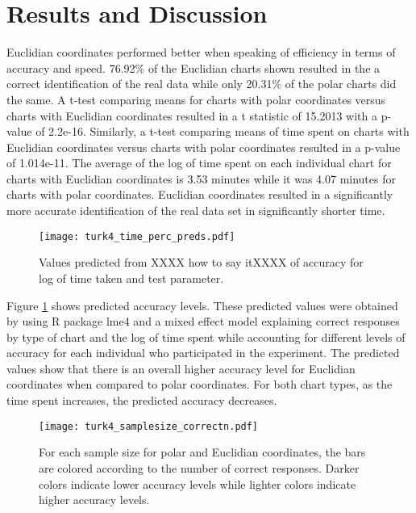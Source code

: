\section{Results and Discussion}

Euclidian coordinates performed better when speaking of efficiency in terms of accuracy and speed. 76.92\% of the Euclidian charts shown resulted in the a correct identification of the real data while only 20.31\% of the polar charts did the same. A t-test comparing means for charts with polar coordinates versus charts with Euclidian coordinates resulted in a t statistic of 15.2013 with a p-value of 2.2e-16. Similarly, a t-test comparing means of time spent on charts with Euclidian coordinates versus charts with polar coordinates resulted in a p-value of 1.014e-11. The average of the log of time spent on each individual chart for charts with Euclidian coordinates is 3.53 minutes while it was 4.07 minutes for charts with polar coordinates. Euclidian coordinates resulted in a significantly more accurate identification of the real data set in significantly shorter time. 

\begin{figure}[htbp] %
   \centering
   \texttt{[image: turk4\_time\_perc\_preds.pdf]}  
   \caption{Values predicted from XXXX how to say itXXXX of accuracy for log of time taken and test parameter.}
   \label{accuracy_preds}
\end{figure}

Figure \ref{accuracy_preds} shows predicted accuracy levels. These predicted values were obtained by using R package lme4 and a mixed effect model explaining correct responses by type of chart and the log of time spent while accounting for different levels of accuracy for each individual who participated in the experiment. The predicted values show that there is an overall higher accuracy level for Euclidian coordinates when compared to polar coordinates. For both chart types, as the time spent increases, the predicted accuracy decreases. 

\begin{figure}[htbp] %
   \centering
   \texttt{[image: turk4\_samplesize\_correctn.pdf]}  
   \caption{For each sample size for polar and Euclidian coordinates, the bars are colored according to the number of correct responses. Darker colors indicate lower accuracy levels while lighter colors indicate higher accuracy levels. }
   \label{samp_size_acc}
\end{figure}

